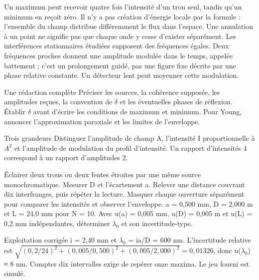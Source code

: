 Un maximum peut recevoir quatre fois l’intensité d’un trou seul, tandis qu’un minimum en reçoit zéro. Il n’y a pas création d’énergie locale par la formule : l’ensemble du champ distribue différemment le flux dans l’espace. Une annulation à un point ne signifie pas que chaque onde y cesse d’exister séparément.
Les interférences stationnaires étudiées supposent des fréquences égales. Deux fréquences proches donnent une amplitude modulée dans le temps, appelée battement ; c’est un prolongement guidé, pas une figure fixe décrite par une phase relative constante. Un détecteur lent peut moyenner cette modulation.
\begin{methode}{Une rédaction complète}
Préciser les sources, la cohérence supposée, les amplitudes reçues, la convention de \ensuremath{\delta} et les éventuelles phases de réflexion. Établir \ensuremath{\delta} avant d’écrire les conditions de maximum et minimum. Pour Young, annoncer l’approximation paraxiale et les limites de l’enveloppe.
\end{methode}
\begin{piege}{Trois grandeurs}
Distinguer l’amplitude de champ A, l’intensité I proportionnelle à $A^2$ et l’amplitude de modulation du profil d’intensité. Un rapport d’intensités 4 correspond à un rapport d’amplitudes 2.
\end{piege}


Éclairer deux trous ou deux fentes étroites par une même source monochromatique. Mesurer D et l’écartement a. Relever une distance couvrant dix interfranges, puis répéter la lecture. Masquer chaque ouverture séparément pour comparer les intensités et observer l’enveloppe.
a = 0,500 mm, D = 2,000 m et L = 24,0 mm pour N = 10. Avec u(a) = 0,005 mm, u(D) = 0,005 m et u(L) = 0,2 mm indépendantes, déterminer \ensuremath{\lambda_0} et son incertitude-type.
\begin{methode}{Exploitation corrigée}
i = 2,40 mm et \ensuremath{\lambda_0} = ia/D = 600 nm. L’incertitude relative est $\sqrt{(0{,}2/24)^2+(0{,}005/0{,}500)^2+(0{,}005/2{,}000)^2}=0{,}01326$, donc u(\ensuremath{\lambda_0}) ≈ 8 nm. Compter dix intervalles exige de repérer onze maxima. Le jeu fourni est simulé.
\end{methode}


